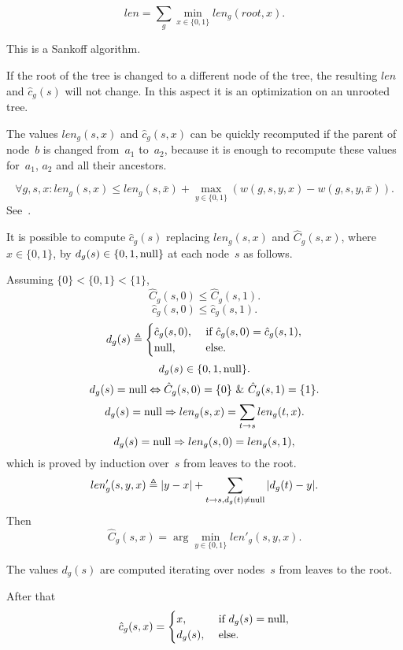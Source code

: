 \documentclass[10pt,a4paper]{article}
\theoremstyle{plain} \newtheorem{Lem}{Lemma}
\begin{document}
$$ len = \sum_g \min_{x \in \{0,1\}} len_g(root,x). $$

This is a Sankoff algorithm.

If the root of the tree is changed to a different node of the tree, the resulting $len$ and $\hat c_g(s)$ will not change.
In this aspect it is an optimization on an unrooted tree.

The values $len_g(s,x)$ and $\hat c_g(s,x)$ can be quickly recomputed if the parent of node~$b$ is changed from~$a_1$ to~$a_2$,
because it is enough to recompute these values for~$a_1$, $a_2$ and all their ancestors.

$$ \forall g,s,x : len_g (s,x) \le len_g(s,\bar x) + \max_{y \in \{0,1\}} (w(g,s,y,x) - w(g,s,y,\bar x)). $$
See~\cite{Mirkin03}.


\comm
{
It is possible to compute $\hat c_g(s)$ replacing $len_g(s,x)$ and $\hat C_g(s,x)$, where $x\in \{0,1\}$, by $d_g(s) \in \{0,1,\mathrm {null}\}$ at each node~$s$ as follows.

Assuming $\{0\} < \{0,1\} < \{1\}$,
$$ \hat C_g(s,0) \le \hat C_g(s,1). $$
$$ \hat c_g(s,0) \le \hat c_g(s,1). $$
\begin{equation*}
d_g(s) \triangleq
  \begin{cases}
    \hat c_g(s,0), &\text{ if } \hat c_g(s,0) = \hat c_g(s,1),\\
    \mathrm {null}, &\text{ else.}
  \end{cases}
\end{equation*}
$$ d_g(s) \in \{0, 1, \mathrm {null} \}. $$
$$ d_g(s) = \mathrm {null} \Leftrightarrow \hat C_g(s,0) = \{0\} \ \& \  \hat C_g(s,1) = \{1\}. $$
$$ d_g(s) = \mathrm {null} \Rightarrow len_g(s,x) = \sum_{t \to s} len_g(t,x). $$
$$ d_g(s) = \mathrm {null} \Rightarrow len_g(s,0) = len_g(s,1), $$
which is proved by induction over~$s$ from leaves to the root.
$$ len'_g(s,y,x) \triangleq |y - x| + \sum_{t \to s, d_g(t) \not= \mathrm {null}} |d_g(t) - y|. $$
Then
$$ \hat C_g(s,x) = \arg \min_{y \in \{0,1\}} len'_g(s,y,x). $$

The values $d_g(s)$ are computed iterating over nodes~$s$ from leaves to the root.

After that
\begin{equation*}
\hat c_g(s,x) =   \begin{cases}
    x, &\text{ if } d_g(s) = \mathrm {null},\\
    d_g(s), &\text{ else.}
  \end{cases}
\end{equation*}
}
\end{document}
